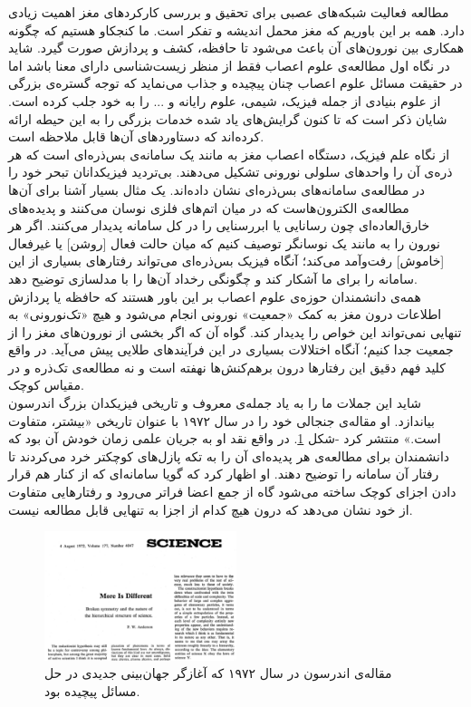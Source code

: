 مطالعه فعالیت شبکه‌های عصبی برای تحقیق و بررسی کارکردهای مغز اهمیت زیادی دارد. همه بر این باوریم که مغز محمل اندیشه و تفکر است. ما کنجکاو هستیم که چگونه همکاری بین نورون‌های آن باعث می‌شود تا حافظه، کشف و پردازش صورت گیرد. شاید در نگاه اول مطالعه‌ی علوم اعصاب فقط از منظر زیست‌شناسی دارای معنا باشد اما در حقیقت مسائل علوم اعصاب چنان پیچیده و جذاب می‌نماید که توجه گستره‌ی بزرگی از علوم بنیادی از جمله فیزیک، شیمی، علوم رایانه و ... را به خود جلب کرده است. شایان ذکر است که تا کنون گرایش‌های یاد شده خدمات بزرگی را به این حیطه‌ ارائه کرده‌اند که دستاوردهای آن‌ها قابل ملاحظه است.\\

از نگاه علم فیزیک، دستگاه اعصاب مغز به مانند یک سامانه‌ی بس‌ذره‌ای است که هر ذره‌ی آن را واحدهای سلولی نورونی تشکیل می‌دهند. بی‌تردید فیزیکدانان تبحر خود را در مطالعه‌ی سامانه‌های بس‌ذره‌ای نشان داده‌اند. یک مثال بسیار آشنا برای آن‌ها مطالعه‌ی الکترون‌هاست که در میان اتم‌های فلزی نوسان می‌کنند و پدیده‌های خارق‌العاده‌ای چون رسانایی یا ابررسنایی را در کل سامانه پدیدار می‌کنند. اگر هر نورون را به مانند یک نوسانگر توصیف کنیم که میان حالت فعال [روشن] یا غیرفعال [خاموش] رفت‌وآمد می‌کند؛ آنگاه فیزیک بس‌ذره‌ای می‌تواند رفتارهای بسیاری از این سامانه را برای ما آشکار کند و چگونگی رخداد آن‌ها را با مدلسازی توضیح دهد.\\

همه‌ی دانشمندان حوزه‌ی علوم اعصاب بر این باور هستند که حافظه یا پردازش اطلاعات درون مغز به کمک «جمعیت» نورونی انجام می‌شود و هیچ «تک‌نورونی» به تنهایی نمی‌تواند این خواص را پدیدار کند. گواه آن که اگر بخشی از نورون‌های مغز را از جمعیت جدا کنیم؛ آنگاه اختلالات بسیاری در این فرآیندهای طلایی پیش می‌آید. در واقع کلید فهم دقیق این رفتارها درون برهم‌کنش‌ها نهفته است و نه مطالعه‌ی تک‌ذره و در مقیاس کوچک.\\

شاید این جملات ما را به یاد جمله‌ی معروف و تاریخی فیزیکدان بزرگ اندرسون بیاندازد. او مقاله‌ی جنجالی خود را در سال ۱۹۷۲ با عنوان تاریخی «بیشتر، متفاوت است.» منتشر کرد -شکل \ref{fig:anderson}. در واقع نقد او به جریان علمی زمان خودش آن بود که دانشمندان برای مطالعه‌ی هر پدیده‌ای آن را به تکه ‌پازل‌های کوچکتر خرد می‌کردند تا رفتار آن سامانه را توضیح دهند. او اظهار کرد که گویا سامانه‌ای که از کنار هم قرار دادن اجزای کوچک ساخته می‌شود گاه از جمع اعضا فراتر می‌رود و رفتارهایی متفاوت از خود نشان می‌دهد که درون هیچ کدام از اجزا به تنهایی قابل مطالعه نیست.\\

\begin{figure}
	\centering
	\includegraphics[width=0.5\textwidth]{../Figures/more_is_different_anderson.png}
	\caption{مقاله‌ی اندرسون در سال ۱۹۷۲ که آغازگر جهان‌بینی جدیدی در حل مسائل پیچیده بود.}
	\label{fig:anderson}
\end{figure}


